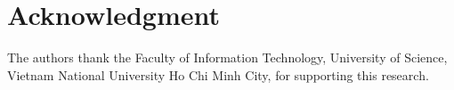 \section*{Acknowledgment}
The authors thank the Faculty of Information Technology, University of Science, Vietnam National University Ho Chi Minh City, for supporting this research.

